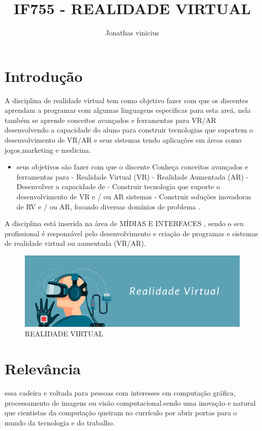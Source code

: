 \documentclass[10pt]{article}
\title{IF755 - REALIDADE VIRTUAL}
\author{Jonathas vinicius }
\date{\vspace{-5ex}}
\begin{document}
\maketitle

\section{Introdução}

A disciplina de realidade virtual tem como objetivo fazer com que os discentes aprendam a programar com algumas linguagens especificas para esta areá, nela também se aprende conceitos avançados e ferramentas para VR/AR desenvolvendo a capacidade do aluno para construir tecnologias que suportem o desenvolvimento de VR/AR e seus sistemas tendo aplicações em áreas como jogos,marketing e medicina.

\begin{itemize}
  \item seus objetivos são fazer com que o discente Conheça conceitos avançados e ferramentas para
- Realidade Virtual (VR)
- Realidade Aumentada (AR)
- Desenvolver a capacidade de
- Construir tecnologia que suporte o desenvolvimento de VR e / ou AR
sistemas
- Construir soluções inovadoras de RV e / ou AR, focando diversas
domínios de problema .\cite{primeira}
\end{itemize}

A disciplina está inserida na área de MÍDIAS E INTERFACES , sendo o seu profissional é responsável pelo desenvolvimento e criação de programas e sistemas de realidade virtual ou aumentada (VR/AR).

\begin{figure}[]
    \centering
    \includegraphics[scale=0.15]{realidadevirtual.png}
    \caption{REALIDADE VIRTUAL \cite{quinta}}
    \label{fig:realidadevirtual}
\end{figure}

\section{Relevância}
essa cadeira e voltada para pessoas com interesses em computação gráfica, processamento de imagens ou visão computacional.sendo uma inovação e natural que cientistas da computação queiram no currículo por abrir portas para o mundo da tecnologia e do trabalho.\cite{segunda}
\end{document}

